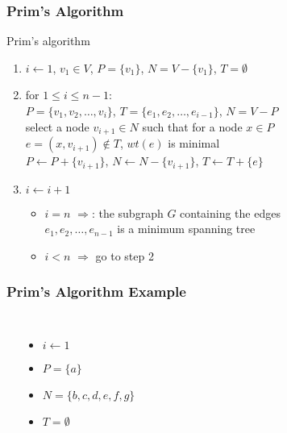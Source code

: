 \documentclass[dvipsnames]{beamer}
\begin{document}
\begin{frame}
  \frametitle{Prim's Algorithm}

  \begin{block}{Prim's algorithm}
    \begin{enumerate}
      \item $i \leftarrow 1$, $v_1 \in V$, $P=\{v_1\}$, $N=V-\{v_1\}$,
        $T=\emptyset$

      \pause
      \item for $1 \leq i \leq n-1$:\\
        $P=\{v_1,v_2,\dots,v_i\}$, $T=\{e_1,e_2,\dots,e_{i-1}\}$, $N=V-P$\\
        select a node $v_{i+1} \in N$ such that for a node $x \in P$\\
        $e=(x,v_{i+1}) \notin T$, $wt(e)$ is minimal\\
        $P \leftarrow P+\{v_{i+1}\}$, $N \leftarrow N-\{v_{i+1}\}$,
        $T \leftarrow T+\{e\}$

      \pause
      \item $i \leftarrow i+1$
      \begin{itemize}
        \item $i=n$ $\Rightarrow$: the subgraph $G$ containing the edges\\
          $e_1,e_2,\dots,e_{n-1}$ is a minimum spanning tree
        \item $i<n$ $\Rightarrow$ go to step 2

      \end{itemize}
    \end{enumerate}
  \end{block}
\end{frame}

\begin{frame}
  \frametitle{Prim's Algorithm Example}

  \begin{example}[initialization]
    \begin{columns}
      \begin{center}
      \end{center}

      \pause
      \begin{itemize}
        \item $i \leftarrow 1$
        \item $P = \{ a \}$
        \item $N = \{ b, c, d, e, f, g \}$
        \item $T = \emptyset$
      \end{itemize}
    \end{columns}
  \end{example}
\end{frame}
\end{document}
